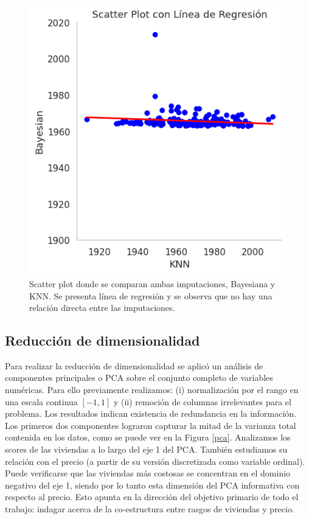 \begin{figure} [!t]
\begin{center}
\includegraphics[width=0.4\columnwidth]{img/regresion.png}
\caption{Scatter plot donde se comparan ambas imputaciones, Bayesiana y KNN. Se presenta línea de regresión y se observa que no hay una relación directa entre las imputaciones.}
\label{regresion}
\end{center}
\end{figure}


\subsection*{Reducción de dimensionalidad}
Para realizar la reducción de dimensionalidad se aplicó un análisis de componentes principales o PCA sobre el conjunto completo de variables numéricas. Para ello previamente realizamos: (i) normalización por el rango en una escala continua \([-1, 1]\) y (ii) remoción de columnas irrelevantes para el problema. Los resultados indican existencia de redundancia en la información. Los primeros dos componentes lograron capturar la mitad de la varianza total contenida en los datos, como se puede ver en la Figura \ref{pca}.
Analizamos los scores de las viviendas a lo largo del eje 1 del PCA. También estudiamos su relación con el precio (a partir de su versión discretizada como variable ordinal). Puede verificarse que las viviendas más costosas se concentran en el dominio negativo del eje 1, siendo por lo tanto esta dimensión del PCA informativa con respecto al precio. Esto apunta en la dirección del objetivo primario de todo el trabajo: indagar acerca de la co-estructura entre rasgos de viviendas y precio.   

